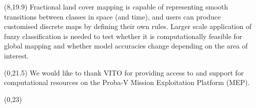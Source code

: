 \documentclass[20pt]{beamer}
\begin{document}
\begin{frame}{}
\begin{textblock}{7}

	\end{textblock}

	\begin{textblock}{7}(8,19.9)
		\Line
		Fractional land cover mapping is capable of representing smooth transitions between classes in space (and time), and users can produce customised discrete maps by defining their own rules. Larger scale application of fuzzy classification is needed to test whether it is computationally feasible for global mapping and whether model accuracies change depending on the area of interest.
		
	\end{textblock}
	
	\begin{textblock}{7}(0,21.5)
		\Line
		We would like to thank VITO for providing access to and support for computational resources on the Proba-V Mission Exploitation Platform (MEP).
		
	\end{textblock}
	

	\begin{textblock}{15}(0,23)
		\Line
	\end{textblock}	
	

\end{frame}
\end{document}
